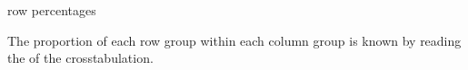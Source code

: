 \documentclass[t]{beamer}
\begin{document}
	\begin{frame}[t]{ row percentages}
	
	
	The proportion of each row group within each column group is known by reading the  of the crosstabulation.
	
	\end{frame}
\end{document}
